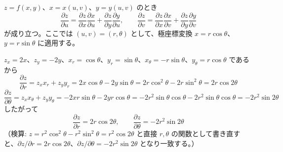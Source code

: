 
$z=f(x,y)$、$x=x(u,v)$、$y=y(u,v)$ のとき
\[
\frac{\partial z}{\partial u} = \frac{\partial z}{\partial x}\frac{\partial x}{\partial u} + \frac{\partial z}{\partial y}\frac{\partial y}{\partial u}, \qquad
\frac{\partial z}{\partial v} = \frac{\partial z}{\partial x}\frac{\partial x}{\partial v} + \frac{\partial z}{\partial y}\frac{\partial y}{\partial v}
\]
が成り立つ。ここでは $(u,v) = (r,\theta)$ として、極座標変換 $x=r\cos\theta$、$y=r\sin\theta$ に適用する。

$z_{x} = 2x$、$z_{y} = -2y$、$x_{r} = \cos\theta$、$y_{r}=\sin\theta$、$x_{\theta} = -r\sin\theta$、$y_{\theta} = r\cos\theta$ であるから
\[
\frac{\partial z}{\partial r} = z_{x}x_{r} + z_{y}y_{r} = 2x\cos\theta - 2y\sin\theta = 2r\cos^{2}\theta - 2r\sin^{2}\theta = 2r\cos 2\theta
\]
\[
\frac{\partial z}{\partial \theta} = z_{x}x_{\theta} + z_{y}y_{\theta} = -2xr\sin\theta - 2yr\cos\theta = -2r^{2}\sin\theta\cos\theta - 2r^{2}\sin\theta\cos\theta = -2r^{2}\sin 2\theta
\]
したがって
\[
\boxed{\; \frac{\partial z}{\partial r} = 2r\cos 2\theta, \qquad \frac{\partial z}{\partial \theta} = -2r^{2}\sin 2\theta \;}
\]
（検算: $z = r^{2}\cos^{2}\theta - r^{2}\sin^{2}\theta = r^{2}\cos 2\theta$ と直接 $r,\theta$ の関数として書き直すと、$\partial z/\partial r = 2r\cos2\theta$、$\partial z/\partial \theta = -2r^{2}\sin2\theta$ となり一致する。）
